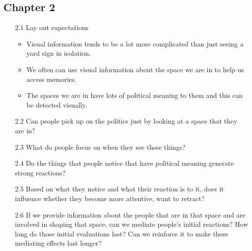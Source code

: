 \documentclass [12pt]{article}
\begin{document}
    \subsection*{Chapter 2}
        \begin{itemize}
            \item[2.1] Lay out expectations 
            \begin{itemize}
                \item Visual information tends to be a lot more complicated than just seeing a yard sign in isolation.
                \item We often can use visual information about the space we are in to help us access memories.
                \item The spaces we are in have lots of political meaning to them and this can be detected visually.
            \end{itemize}
            \item[2.2] Can people pick up on the politics just by looking at a space that they are in?
            \item[2.3] What do people focus on when they see these things?
            \item[2.4] Do the things that people notice that have political meaning generate strong reactions?
            \item[2.5] Based on what they notice and what their reaction is to it, does it influence whether they become more attentive, want to retract?
            \item[2.6] If we provide information about the people that are in that space and are involved in shaping that space, can we mediate people's initial reactions? How long do those initial evaluations last? Can we reinforce it to make these mediating effects last longer?
        \end{itemize}
\end{document}
